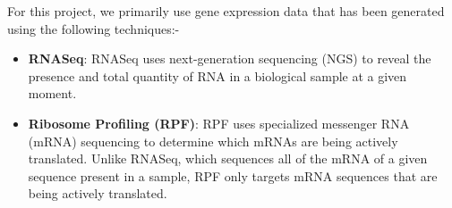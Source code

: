 For this project, we primarily use gene expression data that has been generated using the following techniques:-

\begin{itemize}
    \item \textbf{RNASeq}: RNASeq uses next-generation sequencing (NGS) to reveal the presence and total quantity of RNA in a biological sample at a given moment.
    \item \textbf{Ribosome Profiling (RPF)}: RPF uses specialized messenger RNA (mRNA) sequencing to determine which mRNAs are being actively translated. Unlike RNASeq, which sequences all of the mRNA of a given sequence present in a sample, RPF only targets mRNA sequences that are being actively translated.
\end{itemize}


